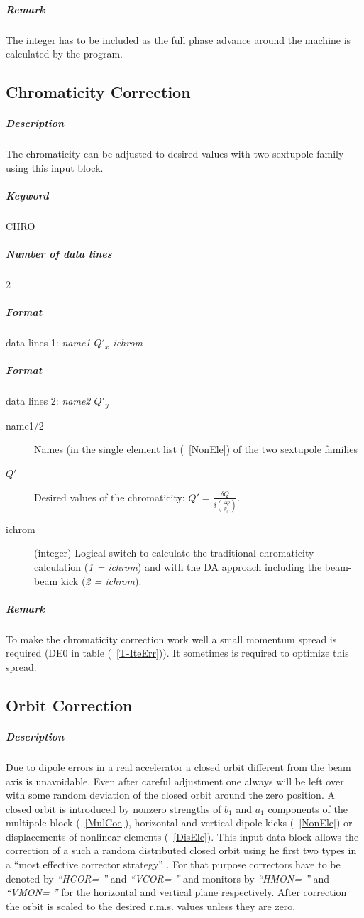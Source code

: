 \documentclass[a4paper,11pt]{report}
\begin{document}
\subparagraph{Remark} The integer has to be included as the full phase
advance around the machine is calculated by the program.

\subsection{Chromaticity Correction} \label{ChrCor}

\subparagraph{Description} The chromaticity can be adjusted
to desired values with two sextupole family using this input block.

\subparagraph{Keyword} CHRO \subparagraph{Number of data lines} 2

\subparagraph{Format} data lines 1: {\em name1 $Q'_x$ ichrom}
\subparagraph{Format} data lines 2: {\em name2 $Q'_y$}

\begin{description}
\item [name1/2] Names (in the single element list (~\ref{NonEle}) of the
  two sextupole families
\item [$Q'$] Desired values of the chromaticity: $Q'=\frac{\delta
    Q}{\delta (\frac{\Delta p}{p_o})}$.
\item [ichrom] (integer) Logical switch to calculate the traditional
  chromaticity calculation ({\it 1 = ichrom}) and with the DA
  approach including the beam-beam kick ({\it 2 = ichrom}).
\end{description}
\subparagraph{Remark} To make the chromaticity correction work well a
small momentum spread is required (DE0 in table (~\ref{T-IteErr})). It
sometimes is required to optimize this spread.

\subsection{Orbit Correction} \label{OrbCorr}

\subparagraph{Description} Due to dipole errors in a real accelerator
a closed orbit different from the beam axis is unavoidable. Even after
careful adjustment one always will be left over with some random
deviation of the closed orbit around the zero position. A closed orbit
is introduced by nonzero strengths of $ b_{1} $ and $ a_{1} $
components of the multipole block (~\ref{MulCoe}), horizontal and
vertical dipole kicks (~\ref{NonEle}) or displacements of nonlinear
elements (~\ref{DisEle}).  This input data block allows the correction
of a such a random distributed closed orbit using he first two types
in a ``most effective corrector strategy'' \cite{Auti}. For that
purpose correctors have to be denoted by {\em ``HCOR= ''} \/and {\em
  ``VCOR= ''} \/and monitors by {\em ``HMON= ''} \/and {\em ``VMON=
  ''} \/for the horizontal and vertical plane respectively. After
correction the orbit is scaled to the desired r.m.s. values unless they
are zero.
\end{document}

